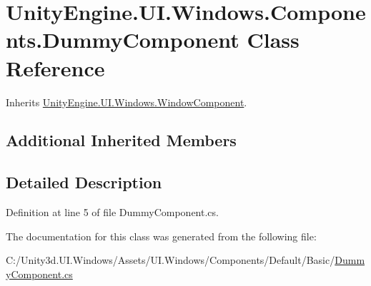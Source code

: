 \hypertarget{class_unity_engine_1_1_u_i_1_1_windows_1_1_components_1_1_dummy_component}{}\section{Unity\+Engine.\+U\+I.\+Windows.\+Components.\+Dummy\+Component Class Reference}
\label{class_unity_engine_1_1_u_i_1_1_windows_1_1_components_1_1_dummy_component}


Inherits \hyperlink{class_unity_engine_1_1_u_i_1_1_windows_1_1_window_component}{Unity\+Engine.\+U\+I.\+Windows.\+Window\+Component}.

\subsection*{Additional Inherited Members}


\subsection{Detailed Description}


Definition at line 5 of file Dummy\+Component.\+cs.



The documentation for this class was generated from the following file\+:\begin{DoxyCompactItemize}
\item 
C\+:/\+Unity3d.\+U\+I.\+Windows/\+Assets/\+U\+I.\+Windows/\+Components/\+Default/\+Basic/\hyperlink{_dummy_component_8cs}{Dummy\+Component.\+cs}\end{DoxyCompactItemize}
